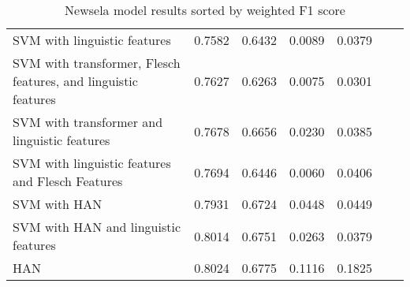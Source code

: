 \documentclass[11pt,a4paper]{article}
\theoremstyle{definition}
\begin{document}
\begin{table}
{\begin{tabular}{p{7cm}p{1.5cm}p{1.5cm}p{1.5cm}p{1.5cm}p{1.5cm}p{1.5cm}}
SVM with linguistic features & 0.7582 & 0.6432 & 0.0089 & 0.0379 \\
SVM with transformer, Flesch features, and linguistic features & 0.7627 & 0.6263 & 0.0075 & 0.0301 \\
SVM with transformer and linguistic features & 0.7678 & 0.6656 & 0.0230 & 0.0385 \\
SVM with linguistic features and Flesch Features & 0.7694 & 0.6446 & 0.0060 & 0.0406 \\
SVM with HAN & 0.7931 & 0.6724 & 0.0448 & 0.0449 \\
SVM with HAN and linguistic features & 0.8014 & 0.6751 & 0.0263 & 0.0379 \\
HAN & 0.8024 & 0.6775 & 0.1116 & 0.1825 \\
\end{tabular}
} \caption{Newsela model results sorted by weighted F1 score}
    \label{tab:NewselaFullResults}
\end{table}
 
\end{document}
